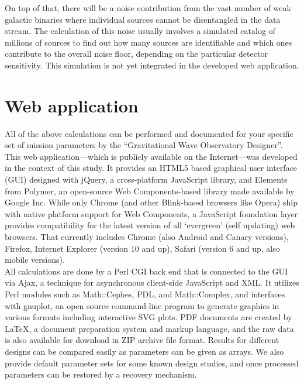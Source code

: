\documentclass[fleqn,10pt]{<approot>/designer/latexelements/SelfArx} %
\begin{document}
On top of that, there will be a noise contribution from the vast number of weak galactic binaries where individual sources cannot be disentangled in the data stream. The calculation of this noise usually involves a simulated catalog of millions of sources to find out how many sources are identifiable and which ones contribute to the overall noise floor, depending on the particular detector sensitivity. This simulation is not yet integrated in the developed web application.


\section*{Web application}

All of the above calculations can be performed and documented for your specific set of mission parameters by the ``Gravitational Wave Observatory Designer''. This web application---which is publicly available on the Internet---was developed in the context of this study. It provides an HTML5 based graphical user interface (GUI) designed with jQuery, a cross-platform JavaScript library, and Elements from Polymer, an open-source Web Components-based library made available by Google Inc. While only Chrome (and other Blink-based browsers like Opera) ship with native platform support for Web Components, a JavaScript foundation layer provides compatibility for the latest version of all `evergreen' (self updating) web browsers. That currently includes Chrome (also Android and Canary versions), Firefox, Internet Explorer (version 10 and up), Safari (version 6 and up, also mobile versions).\\

All calculations are done by a Perl CGI back end that is connected to the GUI via Ajax, a technique for asynchronous client-side JavaScript and XML. It utilizes Perl modules such as Math::Cephes, PDL, and Math::Complex, and interfaces with gnuplot, an open source command-line program to generate graphics in various formats including interactive SVG plots. PDF documents are created by LaTeX, a document preparation system and markup language, and the raw data is also available for download in ZIP archive file format.
Results for different designs can be compared easily as parameters can be given as arrays. We also provide default parameter sets for some known design studies, and once processed parameters can be restored by a recovery mechanism.\\
\end{document}
